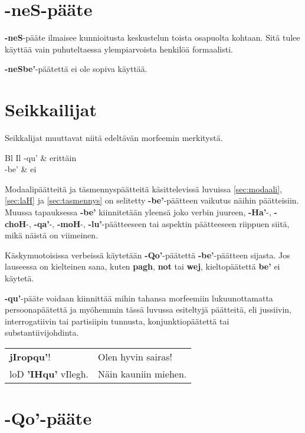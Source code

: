 \documentclass{book}
\begin{document}
\section{-neS-pääte}

\textbf{-neS}-pääte ilmaisee kunnioitusta keskustelun toista osapuolta kohtaan.
Sitä tulee käyttää vain puhuteltaessa ylempiarvoista henkilöä formaalisti.

\textbf{-neSbe'}-päätettä ei ole sopiva käyttää.

\section{Seikkailijat}

Seikkalijat muuttavat niitä edeltävän morfeemin merkitystä.

\begin{tabular}{Bl Il}
    -qu' & erittäin \\
    -be' & ei \\
\end{tabular}

Modaalipäätteitä ja täsmennyspäätteitä käsittelevissä luvuissa \ref{sec:modaali}, \ref{sec:laH} ja \ref{sec:tasmennys} on selitetty \textbf{-be'}-päätteen vaikutus näihin päätteisiin.
Muussa tapauksessa \textbf{-be'} kiinnitetään yleensä joko verbin juureen, \textbf{-Ha'}-, \textbf{-choH}-, \textbf{-qa'}-, \textbf{-moH}-, \textbf{-lu'}-päätteeseen tai aspektin päätteeseen riippuen siitä, mikä näistä on viimeinen.

Käskymuotoisissa verbeissä käytetään \textbf{-Qo'}-päätettä \textbf{-be'}-päätteen sijasta.
Jos lauseessa on kielteinen sana, kuten \textbf{pagh}, \textbf{not} tai \textbf{wej}, kieltopäätettä \textbf{be'} ei käytetä.

\textbf{-qu'}-pääte voidaan kiinnittää mihin tahansa morfeemiin lukuunottamatta persoonapäätettä ja myöhemmin tässä luvussa esiteltyjä päätteitä, eli jussiivin, interrogatiivin tai partisiipin tunnusta, konjunktiopäätettä tai substantiivijohdinta.

\begin{tabular}{l l}
    \textbf{jIropqu'}! & Olen hyvin sairas! \\
    loD \textbf{'IHqu'} vIlegh. & Näin kauniin miehen. \\
\end{tabular}

\section{-Qo'-pääte}
\end{document}
